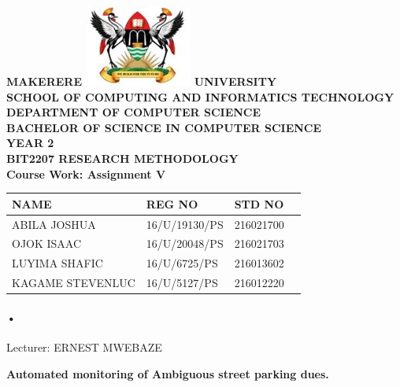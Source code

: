 \documentclass[12pt]{article}
\begin{document}
\begin{Huge}
\begin{center}
\begin{normalsize}
\textbf{MAKERERE \includegraphics[scale=0.5]{logo} UNIVERSITY }\\

\textbf{SCHOOL OF COMPUTING AND INFORMATICS TECHNOLOGY} \\
\textbf{DEPARTMENT OF COMPUTER SCIENCE} \\
\textbf{BACHELOR OF SCIENCE IN COMPUTER SCIENCE} \\
\textbf{YEAR 2} \\
\textbf{BIT2207 RESEARCH METHODOLOGY} \\
\textbf{Course Work: Assignment V}
\end{normalsize}
\end{center}
\end{Huge}

\begin{center}
\begin{tabular}{|l|l|l|c|}
\hline NAME  & REG NO & STD NO \\\hline
ABILA JOSHUA& 16/U/19130/PS & 216021700 \\\hline
OJOK ISAAC& 16/U/20048/PS& 216021703 \\\hline
LUYIMA SHAFIC& 16/U/6725/PS	 & 216013602 \\\hline
KAGAME STEVENLUC&16/U/5127/PS  & 216012220\\\hline
\end{tabular}

\paragraph{•}
Lecturer: ERNEST MWEBAZE \\


\end{center}

\newpage

\begin{center}
\textbf{\sc Automated monitoring of Ambiguous street parking dues.}\\
\end{center}
\end{document}
